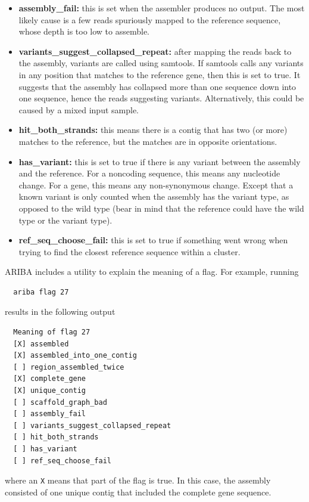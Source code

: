 \documentclass[11pt, a4paper]{article}
\begin{document}
\begin{itemize}
  \item \textbf{assembly\_fail:} this is set when the assembler produces no output.
    The most likely cause is a few reads spuriously mapped to the reference
    sequence, whose depth is too low to assemble.

  \item \textbf{variants\_suggest\_collapsed\_repeat:} after mapping the reads
    back to the assembly, variants are called using samtools. If samtools
    calls any variants in any position that matches to the reference gene,
    then this is set to true. It suggests that the assembly has collapsed
    more than one sequence down into one sequence, hence the reads suggesting
    variants. Alternatively, this could be caused by a mixed input sample.

  \item \textbf{hit\_both\_strands:} this means there is a contig that has two
    (or more) matches to the reference, but the matches are in opposite
    orientations.

  \item \textbf{has\_variant:} this is set to true if there is any variant
    between the assembly and the reference. For a noncoding sequence, this
    means any nucleotide change. For a gene, this means any non-synonymous
    change. Except that a known variant is only counted when the assembly has
    the variant type, as opposed to the wild type (bear in mind that the
    reference could have the wild type or the variant type).

  \item \textbf{ref\_seq\_choose\_fail:} this is set to true if something went
    wrong when trying to find the closest reference sequence within a cluster.
\end{itemize}
ARIBA includes a utility to explain the meaning of a flag. For example,
running
\begin{verbatim}
  ariba flag 27
\end{verbatim}
results in the following output
\begin{verbatim}
  Meaning of flag 27
  [X] assembled
  [X] assembled_into_one_contig
  [ ] region_assembled_twice
  [X] complete_gene
  [X] unique_contig
  [ ] scaffold_graph_bad
  [ ] assembly_fail
  [ ] variants_suggest_collapsed_repeat
  [ ] hit_both_strands
  [ ] has_variant
  [ ] ref_seq_choose_fail
\end{verbatim}
where an \verb+X+ means that part of the flag is true. In this case, the
assembly consisted of one unique contig that included the complete gene
sequence.
\end{document}
